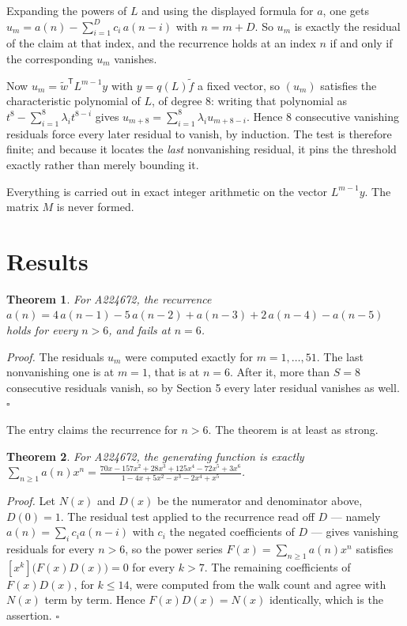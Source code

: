 \documentclass[11pt]{article}
\newtheorem{theorem}{Theorem}
\theoremstyle{definition}
\begin{document}
Expanding the powers of $L$ and using the displayed formula for $a$, one gets $u_m = a(n) - \sum_{i=1}^{D} c_i\,a(n-i)$ with $n = m + D$. So $u_m$ is exactly the residual of the claim at that index, and the recurrence holds at an index $n$ if and only if the corresponding $u_m$ vanishes.

Now $u_m = \tilde w^{\mathsf T} L^{m-1} y$ with $y = q(L)\tilde f$ a fixed vector, so $(u_m)$ satisfies the characteristic polynomial of $L$, of degree $8$: writing that polynomial as $t^{8} - \sum_{i=1}^{8} \lambda_i t^{8-i}$ gives $u_{m+8} = \sum_{i=1}^{8} \lambda_i u_{m+8-i}$. Hence $8$ consecutive vanishing residuals force every later residual to vanish, by induction. The test is therefore finite; and because it locates the {\itshape last} nonvanishing residual, it pins the threshold exactly rather than merely bounding it.

Everything is carried out in exact integer arithmetic on the vector $L^{m-1}y$. The matrix $M$ is never formed.

\section{Results}

\begin{theorem} For A224672, the recurrence $a(n) = 4\,a(n-1) - 5\,a(n-2) + a(n-3) + 2\,a(n-4) - a(n-5)$ holds for every $n > 6$, and fails at $n = 6$.\end{theorem}

{\itshape Proof.} The residuals $u_m$ were computed exactly for $m = 1,\dots,51$. The last nonvanishing one is at $m = 1$, that is at $n = 6$. After it, more than $S = 8$ consecutive residuals vanish, so by Section 5 every later residual vanishes as well. $\square$

The entry claims the recurrence for $n > 6$. The theorem is at least as strong.

\begin{theorem} For A224672, the generating function is exactly $\sum_{n\ge 1} a(n)x^n = \frac{70x - 157x^{2} + 28x^{3} + 125x^{4} - 72x^{5} + 3x^{6}}{1 - 4x + 5x^{2} - x^{3} - 2x^{4} + x^{5}}$.\end{theorem}

{\itshape Proof.} Let $N(x)$ and $D(x)$ be the numerator and denominator above, $D(0)=1$. The residual test applied to the recurrence read off $D$ --- namely $a(n) = \sum_i c_i a(n-i)$ with $c_i$ the negated coefficients of $D$ --- gives vanishing residuals for every $n > 6$, so the power series $F(x)=\sum_{n\ge 1}a(n)x^n$ satisfies $[x^k]\bigl(F(x)D(x)\bigr) = 0$ for every $k > 7$. The remaining coefficients of $F(x)D(x)$, for $k \le 14$, were computed from the walk count and agree with $N(x)$ term by term. Hence $F(x)D(x) = N(x)$ identically, which is the assertion. $\square$
\end{document}

